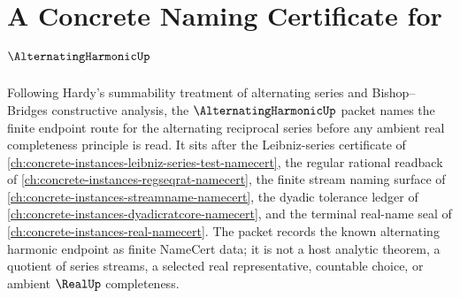 \chapter{A Concrete Naming Certificate for $\AlternatingHarmonicUp$}
\label{ch:concrete-instances-alternating-harmonic-namecert}

Following Hardy's summability treatment of alternating series and Bishop--Bridges constructive analysis, the $\AlternatingHarmonicUp$ packet names the finite endpoint route for the alternating reciprocal series before any ambient real completeness principle is read. It sits after the Leibniz-series certificate of \autoref{ch:concrete-instances-leibniz-series-test-namecert}, the regular rational readback of \autoref{ch:concrete-instances-regseqrat-namecert}, the finite stream naming surface of \autoref{ch:concrete-instances-streamname-namecert}, the dyadic tolerance ledger of \autoref{ch:concrete-instances-dyadicratcore-namecert}, and the terminal real-name seal of \autoref{ch:concrete-instances-real-namecert}. The packet records the known alternating harmonic endpoint as finite NameCert data; it is not a host analytic theorem, a quotient of series streams, a selected real representative, countable choice, or ambient $\RealUp$ completeness.

